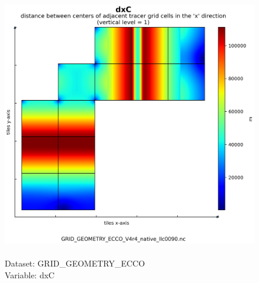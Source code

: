 \begin{figure}[H]
\centering
\includegraphics[scale=0.5]{../images/plots/native_plots_coords/Geometry_Parameters_for_the_Lat-Lon-Cap_90_(llc90)_Native_Model_Grid_(Version_4_Release_4)/dxC.png}
\caption{\\Dataset: GRID\_GEOMETRY\_ECCO\\Variable: dxC}
\label{tab:table-GRID_GEOMETRY_ECCO_dxC-Plot}
\end{figure}
\pagebreak

